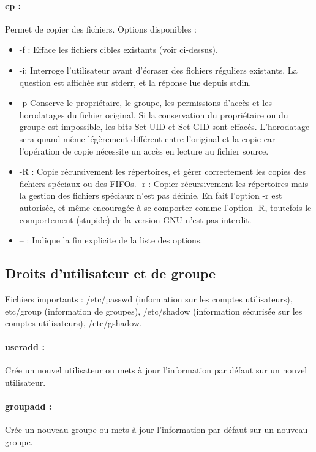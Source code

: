 \documentclass{article}[12pt]
\begin{document}
\paragraph{\href{http://jp.barralis.com/linux-man/man1/cp.1.php}{cp} : } Permet de copier des fichiers. Options disponibles : 
\begin{itemize}
\item -f : Efface les fichiers cibles existants (voir ci-dessus).
\item -i: Interroge l'utilisateur avant d'écraser des fichiers réguliers existants. La question est affichée sur stderr, et la réponse lue depuis stdin.
\item -p Conserve le propriétaire, le groupe, les permissions d'accès et les horodatages du fichier original. Si la conservation du propriétaire ou du groupe est impossible, les bits Set-UID et Set-GID sont effacés. L'horodatage sera quand même légèrement différent entre l'original et la copie car l'opération de copie nécessite un accès en lecture au fichier source.
\item -R : Copie récursivement les répertoires, et gérer correctement les copies des fichiers spéciaux ou des FIFOs.
-r : Copier récursivement les répertoires mais la gestion des fichiers spéciaux n'est pas définie. En fait l'option -r est autorisée, et même encouragée à se comporter comme l'option -R, toutefois le comportement (stupide) de la version GNU n'est pas interdit.
\item -- : Indique la fin explicite de la liste des options.
\end{itemize}
\subsection{Droits d'utilisateur et de groupe}
Fichiers importants : /etc/passwd (information sur les comptes utilisateurs), etc/group (information de groupes), /etc/shadow (information sécurisée sur les comptes utilisateurs), /etc/gshadow.
\paragraph{\href{http://jp.barralis.com/linux-man/man8/useradd.8.php}{useradd} : } Crée un nouvel utilisateur ou mets à jour l'information par défaut sur un nouvel utilisateur.
\paragraph{groupadd : } Crée un nouveau groupe ou mets à jour l'information par défaut sur un nouveau groupe.
\end{document}
